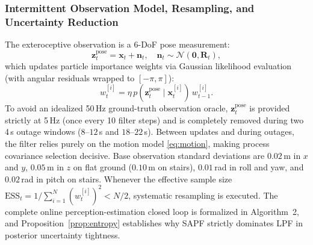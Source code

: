 \documentclass[11pt, a4paper]{article}
\begin{document}
\subsubsection{Intermittent Observation Model, Resampling, and Uncertainty Reduction}
The exteroceptive observation is a 6-DoF pose measurement:
\begin{equation}
    \mathbf{z}^{\text{pose}}_t = \mathbf{x}_t + \mathbf{n}_t,
    \quad \mathbf{n}_t \sim \mathcal{N}(\mathbf{0},\mathbf{R}_t),
    \label{eq:obs}
\end{equation}
which updates particle importance weights via Gaussian likelihood evaluation (with angular residuals wrapped to $[-\pi,\pi]$):
\begin{equation}
    w^{[i]}_t = \eta\, p(\mathbf{z}^{\text{pose}}_t\mid\mathbf{x}^{[i]}_t)\,w^{[i]}_{t-1}.
    \label{eq:weight}
\end{equation}
To avoid an idealized 50\,Hz ground-truth observation oracle, $\mathbf{z}^{\text{pose}}_t$ is provided strictly at 5\,Hz (once every 10 filter steps) and is completely removed during two 4\,s outage windows ($8$--$12$\,s and $18$--$22$\,s). Between updates and during outages, the filter relies purely on the motion model \eqref{eq:motion}, making process covariance selection decisive. Base observation standard deviations are $0.02$\,m in $x$ and $y$, $0.05$\,m in $z$ on flat ground ($0.10$\,m on stairs), $0.01$\,rad in roll and yaw, and $0.02$\,rad in pitch on stairs. Whenever the effective sample size $\mathrm{ESS}_t = 1/\sum_{i=1}^N (w^{[i]}_t)^2 < N/2$, systematic resampling is executed. The complete online perception-estimation closed loop is formalized in Algorithm~2, and Proposition~\ref{prop:entropy} establishes why SAPF strictly dominates LPF in posterior uncertainty tightness.
\end{document}
